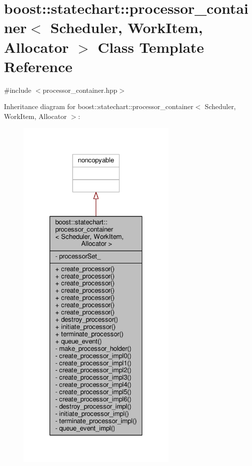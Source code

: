 \hypertarget{classboost_1_1statechart_1_1processor__container}{}\section{boost\+:\+:statechart\+:\+:processor\+\_\+container$<$ Scheduler, Work\+Item, Allocator $>$ Class Template Reference}
\label{classboost_1_1statechart_1_1processor__container}


{\ttfamily \#include $<$processor\+\_\+container.\+hpp$>$}



Inheritance diagram for boost\+:\+:statechart\+:\+:processor\+\_\+container$<$ Scheduler, Work\+Item, Allocator $>$\+:
\nopagebreak
\begin{figure}[H]
\begin{center}
\leavevmode
\includegraphics[width=220pt]{classboost_1_1statechart_1_1processor__container__inherit__graph}
\end{center}
\end{figure}


